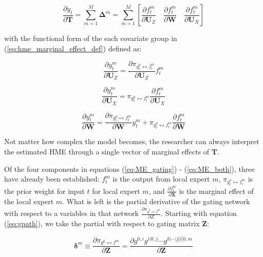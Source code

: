 \documentclass[12pt]{article}
\newcommand{\gateprod}[2]{\pi_{#1 \longleftrightarrow #2}}
\begin{document}
\begin{equation} \label{eq:hme_marginal_effect_def}
  \frac{\partial y_{t}}{\partial \boldsymbol{T}} = \sum_{m=1}^{M} \boldsymbol{\Delta}^{m} = \sum_{m=1}^{M} \left[ \frac{\partial f^{m}_{t}}{\partial \boldsymbol{U}_{Z}}   \quad   \frac{\partial f^{m}_{t}}{\partial \boldsymbol{W}}   \quad   \frac{\partial f^{m}_{t}}{\partial \boldsymbol{U}_{X}}   \right]
\end{equation}

with the functional form of the each covariate group in (\ref{eq:hme_marginal_effect_def})
defined as:


\begin{equation} \label{eq:ME_gating}
  \frac{\partial y_{t}^{m}}{\partial \boldsymbol{U}_{Z}} = \frac{\partial \gateprod{g^{0}_{t}}{f^{m}_{t}}}{{\partial \boldsymbol{U}_{Z}}}f^{m}_{t}
\end{equation}


\begin{equation} \label{eq:ME_expert}
  \frac{\partial y_{t}^{m}}{\partial \boldsymbol{U}_{X}} = \gateprod{g^{0}_{t}}{f^{m}_{t}} \frac{\partial f^{m}_{t}}{{\partial \boldsymbol{U}_{X}}}
\end{equation}


\begin{equation} \label{eq:ME_both}
  \frac{\partial y_{t}^{m}}{\partial \boldsymbol{W}} = \frac{\partial \gateprod{g^{0}_{t}}{f^{m}_{t}}}{{\partial \boldsymbol{W}}}y^{m}_{t} + \gateprod{g^{0}_{t}}{f^{m}_{t}} \frac{\partial f^{m}_{t}}{{\partial \boldsymbol{W}}}
\end{equation}

Not matter how complex the model becomes, the researcher can always interpret
the estimated HME through a single vector of marginal effects of $\boldsymbol{T}$.

Of the four components in equations (\ref{eq:ME_gating}) - (\ref{eq:ME_both}),
three have already been established: $f_{t}^{m}$ is the output from local
expert $m$, $\gateprod{g^{0}_{t}}{f^{m}_{t}}$ is the prior weight for
input $t$ for local expert $m$, and $\frac{\partial f^{m}_{t}}{{\partial \boldsymbol{X}}}$
is the marginal effect of the local expert $m$. What is left is the
partial derivative of the gating network with respect to a variables
in that network $\frac{\partial \gateprod{g^{0}}{f^{m}}}{\partial Z}$.
Starting with equation (\ref{eq:gpath}), we take the partial with
respect to gating matrix $\boldsymbol{Z}$:

\begin{equation}
  \boldsymbol{\delta}^{m} \equiv \frac{\partial \gateprod{g^{0}}{f^{m}}}{\partial \boldsymbol{Z}} = \frac{\partial g^{0, i} g^{i|0, j} \cdots g^{k|\cdots|j|i|0, m}}{\partial \boldsymbol{Z}}
\end{equation}
\end{document}
